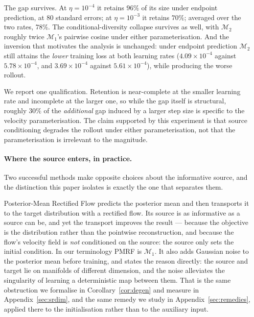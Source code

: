 The gap survives. At $\eta=10^{-4}$ it retains $96\%$ of its size under endpoint prediction, at
$80$ standard errors; at $\eta=10^{-3}$ it retains $70\%$; averaged over the two rates, $78\%$.
The conditional-diversity collapse survives as well, with $\mathcal M_2$ roughly twice
$\mathcal M_1$'s pairwise cosine under either parameterisation. And the inversion that motivates
the analysis is unchanged: under endpoint prediction $\mathcal M_2$ still attains the
\emph{lower} training loss at both learning rates ($4.09\times10^{-4}$ against
$5.78\times10^{-4}$, and $3.69\times10^{-4}$ against $5.61\times10^{-4}$), while producing the
worse rollout.

We report one qualification. Retention is near-complete at the smaller learning rate and
incomplete at the larger one, so while the gap itself is structural, roughly $30\%$ of the
\emph{additional} gap induced by a larger step size is specific to the velocity
parameterisation. The claim supported by this experiment is that source conditioning degrades the
rollout under either parameterisation, not that the parameterisation is irrelevant to the
magnitude.


\paragraph{Where the source enters, in practice.}
Two successful methods make opposite choices about the informative source, and the distinction
this paper isolates is exactly the one that separates them.

Posterior-Mean Rectified Flow \citep{ohayon2024pmrf} predicts the posterior mean and then
transports it to the target distribution with a rectified flow. Its source is as informative as a
source can be, and yet the transport improves the result --- because the objective is the
distribution rather than the pointwise reconstruction, and because the flow's velocity field is
\emph{not} conditioned on the source: the source only sets the initial condition. In our
terminology PMRF is $\mathcal M_1$. It also adds Gaussian noise to the posterior mean before
training, and states the reason directly: the source and target lie on manifolds of different
dimension, and the noise alleviates the singularity of learning a deterministic map between them.
That is the same obstruction we formalise in Corollary~\ref{cor:degen} and measure in
Appendix~\ref{sec:srdim}, and the same remedy we study in Appendix~\ref{sec:remedies}, applied
there to the initialisation rather than to the auxiliary input.

